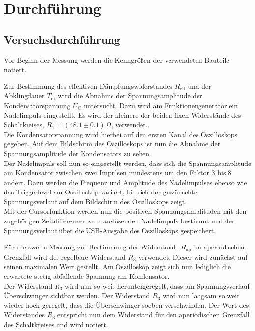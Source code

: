 \section{Durchführung}
\label{sec:Durchführung}



\subsection{Versuchsdurchführung}
\label{sec:Versuchsbeschreibung}

Vor Beginn der Messung werden die Kenngrößen der verwendeten Bauteile notiert.

Zur Bestimmung des effektiven Dämpfungswiderstandes $R_\text{eff}$ und der Abklingdauer $T_\text{ex}$ wird die Abnahme der Spannungsamplitude der Kondensatorspannung $U_\text{C}$ untersucht.
Dazu wird am Funktionengenerator ein Nadelimpuls eingestellt.
Es wird der kleinere der beiden fixen Widerstände des Schaltkreises, $R_\text{1}=(48.1 \pm 0.1)\,\si{\ohm}$, verwendet. \\
Die Kondensatorspannung wird hierbei auf den ersten Kanal des Oszilloskops gegeben.
Auf dem Bildschirm des Oszilloskops ist nun die Abnahme der Spannungsamplitude der Kondensators zu sehen.\\
Der Nadelimpuls soll nun so eingestellt werden, dass sich die Spannungsamplitude am Kondensator zwischen zwei Impulsen mindestens um den Faktor 3 bis 8 ändert.
Dazu werden die Frequenz und Amplitude des Nadelimpulses ebenso wie das Triggerlevel am Oszilloskop variiert, bis sich der gewünschte Spannungsverlauf auf dem Bildschirm des Oszilloskops zeigt.\\
Mit der Cursorfunktion werden nun die positiven Spannungsamplituden mit den zugehörigen Zeitdifferenzen zum auslösenden Nadelimpuls bestimmt und der Spannungsverlauf über die USB-Ausgabe des Oszilloskops gespeichert.


Für die zweite Messung zur Bestimmung des Widerstands $R_\text{ap}$ im aperiodischen Grenzfall wird der regelbare Widerstand $R_\text{3}$ verwendet.
Dieser wird zunächst auf seinen maximalen Wert gestellt. Am Oszilloskop zeigt sich nun lediglich die erwartete stetig abfallende Spannung am Kondensator. \\
Der Widerstand $R_\text{3}$ wird nun so weit heruntergeregelt, dass am Spannungsverlauf Überschwinger sichtbar werden.
Der Widerstand $R_\text{3}$ wird nun langsam so weit wieder hoch geregelt, dass die Überschwinger soeben verschwinden. Der Wert des Widerstandes $R_\text{3}$ entspricht nun dem Widerstand für den aperiodischen Grenzfall des Schaltkreises und wird notiert.

